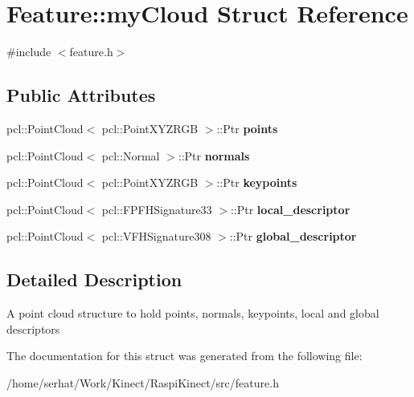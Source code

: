 \hypertarget{struct_feature_1_1my_cloud}{}\section{Feature\+:\+:my\+Cloud Struct Reference}
\label{struct_feature_1_1my_cloud}


{\ttfamily \#include $<$feature.\+h$>$}

\subsection*{Public Attributes}
\begin{DoxyCompactItemize}
\item 
\hypertarget{struct_feature_1_1my_cloud_ab3a2b64ca1ae24ea26e928a2597edef5}{}\label{struct_feature_1_1my_cloud_ab3a2b64ca1ae24ea26e928a2597edef5} 
pcl\+::\+Point\+Cloud$<$ pcl\+::\+Point\+X\+Y\+Z\+R\+GB $>$\+::Ptr {\bfseries points}
\item 
\hypertarget{struct_feature_1_1my_cloud_a43463aa0d0c80c29234771f8b9efcdcb}{}\label{struct_feature_1_1my_cloud_a43463aa0d0c80c29234771f8b9efcdcb} 
pcl\+::\+Point\+Cloud$<$ pcl\+::\+Normal $>$\+::Ptr {\bfseries normals}
\item 
\hypertarget{struct_feature_1_1my_cloud_a716bcd57b3ccf2842db2a65b2d57ed9c}{}\label{struct_feature_1_1my_cloud_a716bcd57b3ccf2842db2a65b2d57ed9c} 
pcl\+::\+Point\+Cloud$<$ pcl\+::\+Point\+X\+Y\+Z\+R\+GB $>$\+::Ptr {\bfseries keypoints}
\item 
\hypertarget{struct_feature_1_1my_cloud_ac62a86862202698a5d567db618454f6a}{}\label{struct_feature_1_1my_cloud_ac62a86862202698a5d567db618454f6a} 
pcl\+::\+Point\+Cloud$<$ pcl\+::\+F\+P\+F\+H\+Signature33 $>$\+::Ptr {\bfseries local\+\_\+descriptor}
\item 
\hypertarget{struct_feature_1_1my_cloud_a03ec69c8ded1fd16ae758cdc175dbbde}{}\label{struct_feature_1_1my_cloud_a03ec69c8ded1fd16ae758cdc175dbbde} 
pcl\+::\+Point\+Cloud$<$ pcl\+::\+V\+F\+H\+Signature308 $>$\+::Ptr {\bfseries global\+\_\+descriptor}
\end{DoxyCompactItemize}


\subsection{Detailed Description}
A point cloud structure to hold points, normals, keypoints, local and global descriptors 

The documentation for this struct was generated from the following file\+:\begin{DoxyCompactItemize}
\item 
/home/serhat/\+Work/\+Kinect/\+Raspi\+Kinect/src/feature.\+h\end{DoxyCompactItemize}
